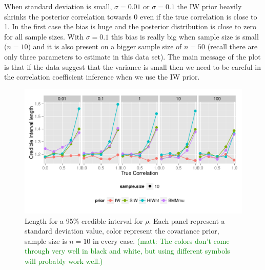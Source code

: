 \documentclass[a4paper]{article}
\newcommand{\matt}[1]{\textcolor{green}{(matt: #1)}}
\begin{document}
When standard deviation is small, $\sigma=0.01$ or $\sigma=0.1$ the IW prior heavily shrinks the posterior correlation towards 0 even if the true correlation is close to 1. In the first case the bias is huge and the posterior distribution is close to zero for all sample sizes.  With $\sigma=0.1$ this bias is really big when sample size is small ($n=10$) and it is also present on a bigger sample size of $n=50$ (recall there are only three parameters to estimate in this data set). The main message of the plot is that if the data suggest that the variance is small then we need to be careful in the correlation coefficient inference when we use the IW prior. 
\begin{figure}[htbp]
   \centering
   \includegraphics[width=\textwidth]{cilength} %
    \vspace{-.5in}
   \caption{Length for a 95\% credible interval for $\rho$. Each panel represent a standard deviation value,  color represent the covariance prior, sample size is $n=10$ in every case.  \label{cilength} \matt{The colors don't come through very well in black and white, but using different symbols will probably work well.} }
\end{figure}
\end{document}
